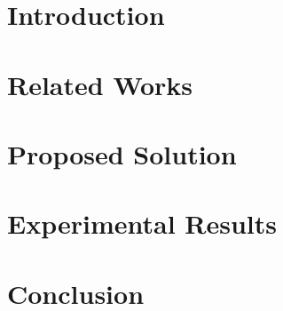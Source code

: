 \documentclass[a4paper,12pt,oneside]{book}
\theoremstyle{definition}
\theoremstyle{definition}
\newcommand\blankpage{%
	\clearpage
	\thispagestyle{plain}
	\null
	\newpage}
\begin{document}

	\tableofcontents
	\listoftables
	\listoffigures	
	
	\onehalfspacing
	\frontmatter	{\tiny }
	\mainmatter
		
	\chapter{Introduction}
	\label{cap:chapter1}
	
	
	\chapter{Related Works}
	\label{cap:chapter2}
	
	
	\chapter{Proposed Solution}
	\label{cap:chapter3}
	
	
	\chapter{Experimental Results}
	\label{cap:chapter5}
	
	
	\chapter{Conclusion}
	\label{cap:chapter6}
	

	\blankpage
	

	 
	
	
\end{document}
